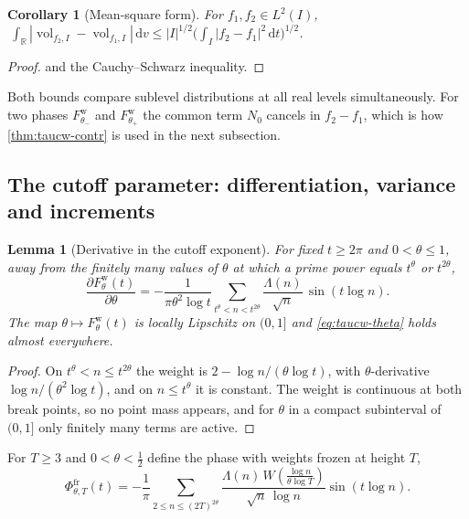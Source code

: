 \documentclass[11pt,a4paper]{article}
\numberwithin{equation}{section}
\newtheorem{lemma}[theorem]{Lemma}
\newtheorem{corollary}[theorem]{Corollary}
\theoremstyle{definition}
\theoremstyle{remark}
\newcommand{\vol}{\operatorname{vol}}
\newcommand{\dd}{\,\mathrm dt}
\begin{document}
\begin{corollary}[Mean-square form]\label{cor:taucw-L2}
For $f_1,f_2\in L^2(I)$, $\ \int_{\mathbb R}|\vol_{f_2,I}-\vol_{f_1,I}|\,\mathrm dv\le|I|^{1/2}\bigl(\int_I|f_2-f_1|^2\dd\bigr)^{1/2}$.
\end{corollary}
\begin{proof}
 and the Cauchy--Schwarz inequality.
\end{proof}
Both bounds compare sublevel distributions at all real levels simultaneously. For two phases $F^{\mathrm w}_{\theta_-}$ and $F^{\mathrm w}_{\theta_+}$ the common term $N_0$ cancels in $f_2-f_1$, which is how \cref{thm:taucw-contr} is used in the next subsection.

\subsection{The cutoff parameter: differentiation, variance and increments}\label{sec:taucw-theta}
\begin{lemma}[Derivative in the cutoff exponent]\label{lem:taucw-theta}
For fixed $t\ge2\pi$ and $0<\theta\le1$, away from the finitely many values of $\theta$ at which a prime power equals $t^\theta$ or $t^{2\theta}$,
\begin{equation}\label{eq:taucw-theta}
\frac{\partial F^{\mathrm w}_\theta(t)}{\partial\theta}=-\frac1{\pi\theta^2\log t}\sum_{t^\theta<n<t^{2\theta}}\frac{\Lambda(n)}{\sqrt n}\,\sin(t\log n).
\end{equation}
The map $\theta\mapsto F^{\mathrm w}_\theta(t)$ is locally Lipschitz on $(0,1]$ and \eqref{eq:taucw-theta} holds almost everywhere.
\end{lemma}
\begin{proof}
On $t^\theta<n\le t^{2\theta}$ the weight is $2-\log n/(\theta\log t)$, with $\theta$-derivative $\log n/(\theta^2\log t)$, and on $n\le t^\theta$ it is constant. The weight is continuous at both break points, so no point mass appears, and for $\theta$ in a compact subinterval of $(0,1]$ only finitely many terms are active.
\end{proof}

For $T\ge3$ and $0<\theta<\frac12$ define the phase with weights frozen at height $T$,
\begin{equation}\label{eq:taucw-frozen}
\Phi^{\mathrm{fr}}_{\theta,T}(t)=-\frac1\pi\sum_{2\le n\le(2T)^{2\theta}}\frac{\Lambda(n)\,W\!\left(\frac{\log n}{\theta\log T}\right)}{\sqrt n\,\log n}\sin(t\log n).
\end{equation}
\end{document}
